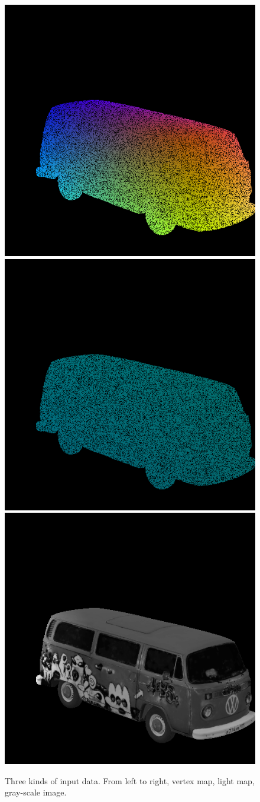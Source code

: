 \begin{figure}[H]
	\centering
	{\includegraphics[width=.25\textwidth]{./Figures/intrinsic_image_vertex_input.png}}
	{\includegraphics[width=.25\textwidth]{./Figures/intrinsic_image_light_input.png}}
	{\includegraphics[width=.25\textwidth]{./Figures/intrinsic_image.png}}
	\decoRule
	\caption{Three kinds of input data. From left to right, vertex map, light map, gray-scale image.}
	\label{fig:light-input}
\end{figure}


